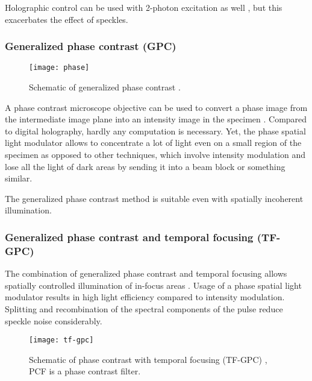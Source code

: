Holographic control can be used with 2-photon excitation as well
\citep{Nikolenko2008}, %
but this exacerbates the effect of speckles.
\subsubsection{Generalized phase contrast (GPC)}
\begin{figure}[!hbt]
  \centering
  \texttt{[image: phase]} %
  \caption{Schematic of generalized phase contrast
    \citep[from][]{Rodrigo2008}.}
  \label{fig:phase}
\end{figure}
A phase contrast microscope objective  can be used to
convert a phase image from the intermediate image plane into an
intensity image in the specimen \citep{Rodrigo2008}. Compared to digital holography, hardly any computation is
necessary. Yet, the phase spatial light modulator allows to
concentrate a lot of light even on a small region of the specimen as
opposed to other techniques, which involve intensity modulation and
lose all the light of dark areas by sending it into a beam block or
something similar.

The generalized phase contrast method is suitable even with spatially
incoherent illumination.
\subsubsection{Generalized phase contrast and temporal focusing (TF-GPC)}
The combination of generalized phase contrast and temporal focusing
allows spatially controlled illumination of in-focus areas
\citep{Papagiakoumou2010}. Usage of a phase spatial light modulator
results in high light efficiency compared to intensity modulation.
Splitting and recombination of the spectral components of the pulse
reduce speckle noise considerably.
\begin{figure}[!hbt]
  \centering
  \texttt{[image: tf-gpc]} 
  \caption{Schematic of phase contrast with temporal focusing (TF-GPC)
    \citep[from][]{Papagiakoumou2010}, PCF is a phase contrast filter.}
  \label{fig:tf-gpc}
\end{figure}

